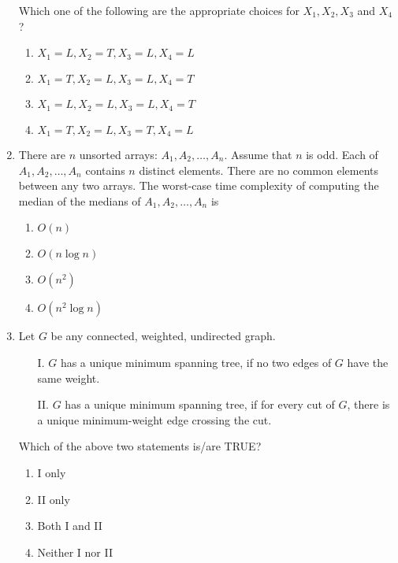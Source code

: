 \documentclass[12pt]{article}
\begin{document}
\begin{enumerate}[label=Q.\arabic*]
Which one of the following are the appropriate choices for $X_1, X_2, X_3$ and $X_4$?
\begin{enumerate}[label=(\Alph*)]
\item $X_1 = L, X_2 = T, X_3 = L, X_4 = L$
\item $X_1 = T, X_2 = L, X_3 = L, X_4 = T$
\item $X_1 = L, X_2 = L, X_3 = L, X_4 = T$
\item $X_1 = T, X_2 = L, X_3 = T, X_4 = L$
\end{enumerate}

\item There are $n$ unsorted arrays: $A_1, A_2, \ldots, A_n$. Assume that $n$ is odd. Each of $A_1, A_2, \ldots, A_n$ contains $n$ distinct elements. There are no common elements between any two arrays. The worst-case time complexity of computing the median of the medians of $A_1, A_2, \ldots, A_n$ is
\begin{enumerate}[label=(\Alph*)]
\item $O(n)$
\item $O(n \log n)$
\item $O(n^2)$
\item $O(n^2 \log n)$
\end{enumerate}

\item Let $G$ be any connected, weighted, undirected graph.

\begin{enumerate}
\item[I.] $G$ has a unique minimum spanning tree, if no two edges of $G$ have the same weight.
\item[II.] $G$ has a unique minimum spanning tree, if for every cut of $G$, there is a unique minimum-weight edge crossing the cut.
\end{enumerate}

Which of the above two statements is/are TRUE?
\begin{enumerate}[label=(\Alph*)]
\item I only
\item II only
\item Both I and II
\item Neither I nor II
\end{enumerate}


\end{enumerate}
\end{document}
